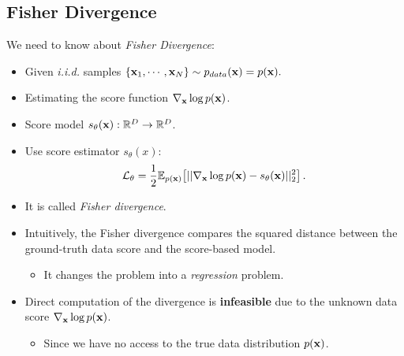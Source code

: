 \subsection{Fisher Divergence}
We need to know about \textit{Fisher Divergence}:
\begin{itemize}
	\item Given \textit{i.i.d.} samples $\{{\mathbf{x}}_1, \cdots, {\mathbf{x}}_N\}\sim p_{data}({\mathbf{x}}) = p({\mathbf{x}}).$
	\item Estimating the score function $\nabla_{\mathbf{x}} \log p({\mathbf{x}})$.
	\item Score model $s_\theta({\mathbf{x}}):\mathbb{R}^D\to \mathbb{R}^D$.
	\item Use score estimator $s_\theta(x)$:
		$$\mathcal{L}_{\theta} = \frac{1}{2}\mathbb{E}_{p({\mathbf{x}})}\big[||\nabla_{\mathbf{x}} \log p({\mathbf{x}})-s_\theta({\mathbf{x}})||^2_2\big]\,.$$
	\item It is called \textit{Fisher divergence}.
	\item Intuitively, the Fisher divergence compares the squared distance between the ground-truth data score and the score-based model. 
	\begin{itemize}
		\item It changes the problem into a \textit{regression} problem.
	\end{itemize}
	\item Direct computation of the divergence is \textbf{infeasible} due to the unknown data score $\nabla_{\mathbf{x}} \log p({\mathbf{x}})$.
	\begin{itemize}
		\item Since we have no access to the true data distribution $p({\mathbf{x}})$.
	\end{itemize}
\end{itemize}

